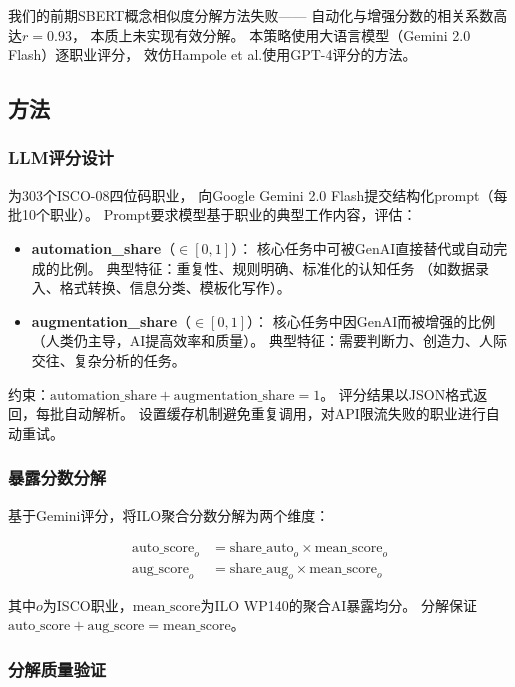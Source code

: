 \documentclass[12pt,a4paper]{ctexart}
\begin{document}
我们的前期SBERT概念相似度分解方法失败——
自动化与增强分数的相关系数高达$r=0.93$，
本质上未实现有效分解。
本策略使用大语言模型（Gemini 2.0 Flash）逐职业评分，
效仿Hampole et al.使用GPT-4评分的方法。

\subsection{方法}

\subsubsection{LLM评分设计}

为303个ISCO-08四位码职业，
向Google Gemini 2.0 Flash提交结构化prompt（每批10个职业）。
Prompt要求模型基于职业的典型工作内容，评估：

\begin{itemize}
\item \textbf{automation\_share}（$\in [0, 1]$）：
      核心任务中可被GenAI直接替代或自动完成的比例。
      典型特征：重复性、规则明确、标准化的认知任务
      （如数据录入、格式转换、信息分类、模板化写作）。

\item \textbf{augmentation\_share}（$\in [0, 1]$）：
      核心任务中因GenAI而被增强的比例（人类仍主导，AI提高效率和质量）。
      典型特征：需要判断力、创造力、人际交往、复杂分析的任务。
\end{itemize}

约束：$\text{automation\_share} + \text{augmentation\_share} = 1$。
评分结果以JSON格式返回，每批自动解析。
设置缓存机制避免重复调用，对API限流失败的职业进行自动重试。

\subsubsection{暴露分数分解}

基于Gemini评分，将ILO聚合分数分解为两个维度：

\begin{align}
\text{auto\_score}_o &= \text{share\_auto}_o \times \text{mean\_score}_o \\
\text{aug\_score}_o &= \text{share\_aug}_o \times \text{mean\_score}_o
\end{align}

其中$o$为ISCO职业，$\text{mean\_score}$为ILO WP140的聚合AI暴露均分。
分解保证$\text{auto\_score} + \text{aug\_score} = \text{mean\_score}$。

\subsubsection{分解质量验证}
\end{document}
